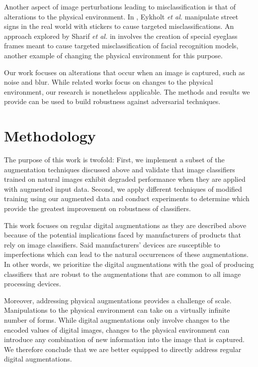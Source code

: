 \documentclass[conference]{IEEEtran}
\begin{document}
Another aspect of image perturbations leading to misclassification is that of alterations to the physical environment. In \cite{robustphysical}, Eykholt {\it et al.} manipulate street signs in the real world with stickers to cause targeted misclassifications. An   approach explored by Sharif {\it et al.} in \cite{Sharif_2019} involves the creation of special eyeglass frames meant to cause targeted misclassification of facial recognition models, another example of changing the physical environment for this purpose.

Our work focuses on alterations that occur when an image is captured, such as noise and blur. While related works focus on changes to the physical environment, our research is nonetheless applicable. The methods and results we provide can be used to build robustness against adversarial techniques.

\section{Methodology}

The purpose of this work is twofold: First, we implement a subset of the augmentation techniques discussed above and validate that image classifiers trained on natural images exhibit degraded performance when they are applied with augmented input data. Second, we apply different techniques of modified training using our augmented data and conduct experiments to determine which provide the greatest improvement on robustness of classifiers.

This work focuses on regular digital augmentations as they are described above because of the potential implications faced by manufacturers of products that rely on image classifiers. Said manufacturers’ devices are susceptible to imperfections which can lead to the natural occurrences of these augmentations. In other words, we prioritize the digital augmentations with the goal of producing classifiers that are robust to the augmentations that are common to all image processing devices.

Moreover, addressing physical augmentations provides a challenge of scale. Manipulations to the physical environment can take on a virtually infinite number of forms. While digital augmentations only involve changes to the encoded values of digital images, changes to the physical environment can introduce any combination of new information into the image that is captured. We therefore conclude that we are better equipped to directly address regular digital augmentations.
\end{document}
